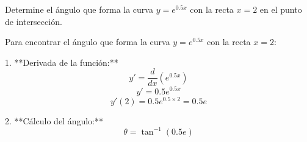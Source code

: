 \documentclass[12pt, answers]{exam} %
\begin{document}
\begin{questions}
\begin{solution}
    
    \end{solution}
    
    

    \question Determine el ángulo que forma la curva \( y = e^{0.5x} \) con la recta \( x = 2 \) en el punto de intersección.

    \begin{solution}

        Para encontrar el ángulo que forma la curva \( y = e^{0.5x} \) con la recta \( x = 2 \):
    
        1. **Derivada de la función:**
        \[
        y' = \frac{d}{dx}\left(e^{0.5x}\right)
        \]
        \[
        y' = 0.5e^{0.5x}
        \]
        \[
        y'(2) = 0.5e^{0.5 \times 2} = 0.5e
        \]
    
        2. **Cálculo del ángulo:**
        \[
        \theta = \tan^{-1}(0.5e)
        \]
    
    \end{solution}
    
    

\end{questions}
\end{document}
